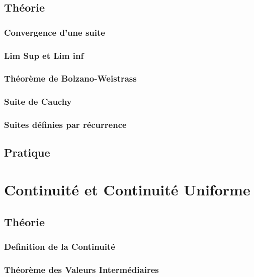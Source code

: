 \documentclass{article}
\begin{document}
\subsection{Théorie}

\subsubsection{Convergence d'une suite}

\subsubsection{Lim Sup et Lim inf}

\subsubsection{Théorème de Bolzano-Weistrass}

\subsubsection{Suite de Cauchy}

\subsubsection{Suites définies par récurrence}

\subsection{Pratique}

\section{Continuité et Continuité Uniforme}

\subsection{Théorie}

\subsubsection{Definition de la Continuité}

\subsubsection{Théorème des Valeurs Intermédiaires}
\end{document}
